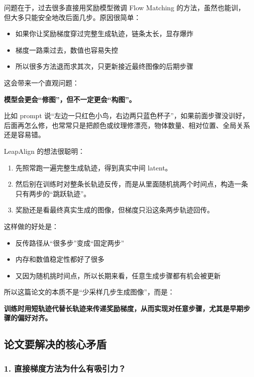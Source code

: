 问题在于，过去很多直接用奖励模型微调 Flow Matching 的方法，虽然也能训，但大多只能安全地改后面几步。原因很简单：

\begin{itemize}[leftmargin=1.5em]
  \item 如果你让奖励梯度穿过完整生成轨迹，链条太长，显存爆炸
  \item 梯度一路乘过去，数值也容易失控
  \item 所以很多方法退而求其次，只更新接近最终图像的后期步骤
\end{itemize}

这会带来一个直观问题：

\textbf{模型会更会“修图”，但不一定更会“构图”。}

比如 prompt 说“左边一只红色小鸟，右边两只蓝色杯子”，如果前面步骤没训好，后面再怎么修，也常常只是把颜色或纹理修漂亮，物体数量、相对位置、全局关系还是容易错。

LeapAlign 的想法很聪明：

\begin{enumerate}[leftmargin=1.5em]
  \item 先照常跑一遍完整生成轨迹，得到真实中间 latent。
  \item 然后别在训练时对整条长轨迹反传，而是从里面随机挑两个时间点，构造一条只有两步的“跳跃轨迹”。
  \item 奖励还是看最终真实生成的图像，但梯度只沿这条两步轨迹回传。
\end{enumerate}

这样做的好处是：

\begin{itemize}[leftmargin=1.5em]
  \item 反传路径从“很多步”变成“固定两步”
  \item 内存和数值稳定性都好了很多
  \item 又因为随机挑时间点，所以长期来看，任意生成步骤都有机会被更新
\end{itemize}

所以这篇论文的本质不是“少采样几步生成图像”，而是：

\textbf{训练时用短轨迹代替长轨迹来传递奖励梯度，从而实现对任意步骤，尤其是早期步骤的偏好对齐。}

\subsection{论文要解决的核心矛盾}

\subsubsection{1. 直接梯度方法为什么有吸引力？}


